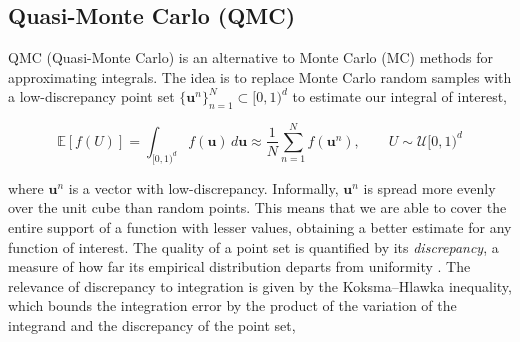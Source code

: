 


\subsection{Quasi-Monte Carlo (QMC)}
\label{sec:qmc}

QMC (Quasi-Monte Carlo) is an alternative to Monte Carlo (MC) methods for approximating integrals. The idea is to replace Monte Carlo random samples with a low-discrepancy point set $\{\mathbf{u}^n\}_{n=1}^N \subset [0,1)^d$ to estimate our integral of interest,


\begin{equation}
    \mathbb{E}[f(U)] = \int_{[0,1)^d} f(\mathbf{u}) \, d\mathbf{u}
    \approx \frac{1}{N} \sum_{n=1}^N f(\mathbf{u}^n),
    \qquad U \sim \mathcal{U}[0,1)^d \nonumber
\end{equation}

where $\mathbf{u}^n$ is a vector with low-discrepancy. Informally, $\mathbf{u}^n$ is spread more evenly over the unit cube than random points. This means that we are able to cover the entire support of a function with lesser values, obtaining a better estimate for any function of interest. The quality of a point set is quantified by its \emph{discrepancy}, a measure of how far its empirical distribution departs from uniformity \citep{niederreiter1992qmc}. The relevance of discrepancy to integration is given by the Koksma--Hlawka inequality, which bounds the integration error by the product of the variation of the integrand and the discrepancy of the point set,

